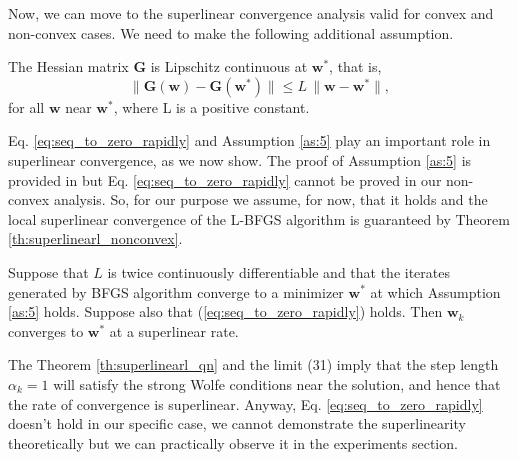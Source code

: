 \noindent Now, we can move to the superlinear convergence analysis valid for convex and non-convex cases. We need to make the following additional assumption.
\begin{assumption}
\label{as:5}
The Hessian matrix $\mathbf{G}$ is Lipschitz continuous at $\mathbf{w}^*$, that is,
\begin{equation}\label{eq:hessian_Lcontinuity}
    \| \mathbf{G}(\mathbf{w}) - \mathbf{G}(\mathbf{w}^*) \| \leq L\,\|\mathbf{w} - \mathbf{w}^*\|,
\end{equation}
for all $\mathbf{w}$ near $\mathbf{w}^*$, where L is a positive constant. 
\end{assumption}

Eq. \ref{eq:seq_to_zero_rapidly} and Assumption \ref{as:5} play an important role in superlinear convergence, as we now show. The proof of Assumption \ref{as:5} is provided in \cite{Nocedal} but Eq. \ref{eq:seq_to_zero_rapidly} cannot be proved in our non-convex analysis. So, for our purpose we assume, for now, that it holds and the local superlinear convergence of the L-BFGS algorithm is guaranteed by Theorem \ref{th:superlinearl_nonconvex}.
\begin{theorem}
\label{th:superlinearl_nonconvex}
Suppose that $L$ is twice continuously differentiable and that the iterates generated by BFGS algorithm converge to a minimizer $\mathbf{w^*}$ at which Assumption \ref{as:5} holds. Suppose also that (\ref{eq:seq_to_zero_rapidly}) holds. Then $\mathbf{w}_k$ converges to $\mathbf{w^*}$ at a superlinear rate.
\end{theorem}

The Theorem \ref{th:superlinearl_qn} and the limit (31) imply that the step length $\alpha_k = 1$ will satisfy the strong Wolfe conditions near the solution, and hence that the rate of convergence is superlinear. Anyway, Eq. \ref{eq:seq_to_zero_rapidly} doesn't hold in our specific case, we cannot demonstrate the superlinearity theoretically but we can practically observe it in the experiments section.  



